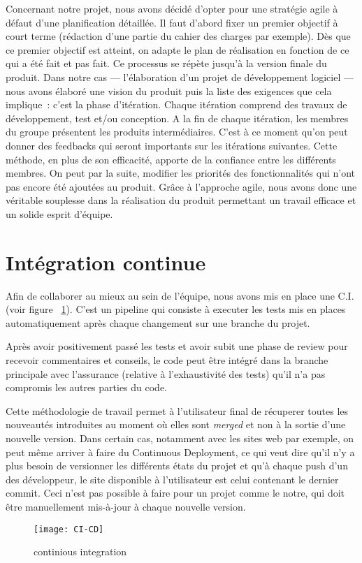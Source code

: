 Concernant notre projet, nous avons décidé d’opter pour une stratégie agile à
défaut d’une planification détaillée. Il faut d’abord fixer un premier objectif
à court terme (rédaction d’une partie du cahier des charges par exemple). Dès
que ce premier objectif est atteint, on adapte le plan de réalisation en
fonction de ce qui a été fait et pas fait. Ce processus se répète jusqu’à la
version finale du produit.
Dans notre cas --- l’élaboration d’un projet de développement logiciel --- nous
avons élaboré une vision du produit puis la liste des exigences que cela
implique : c’est la phase d’itération. Chaque itération comprend des travaux
de développement, test et/ou conception. A la fin de chaque itération, les membres
du groupe présentent les produits intermédiaires. C’est à ce moment qu’on peut
donner des feedbacks qui seront importants sur les itérations suivantes. Cette
méthode, en plus de son efficacité, apporte de la confiance entre les
différents membres.
On peut par la suite, modifier les priorités des fonctionnalités qui n’ont pas
encore été ajoutées au produit.
Grâce à l’approche agile, nous avons donc une  véritable souplesse dans la
réalisation du produit permettant un travail efficace et un solide esprit
d’équipe.

\section{Intégration continue}
Afin de collaborer au mieux au sein de l'équipe, nous avons mis en place
une C.I. (voir figure ~\ref{fig:CI-CD}). C'est un pipeline qui consiste à executer
les tests mis en places automatiquement après chaque changement sur une branche
du projet.
\vspace{0.5cm}

Après avoir positivement passé les tests et avoir subit une phase de review
pour recevoir commentaires et conseils, le code peut être intégré dans la
branche principale avec l'assurance (relative à l’exhaustivité des tests) qu'il
n'a pas compromis les autres parties du code.
\vspace{0.5cm}

Cette méthodologie de travail permet à l’utilisateur final de récuperer toutes
les nouveautés introduites au moment où elles sont \emph{merged} et non à la
sortie d’une nouvelle version. Dans certain cas, notamment avec les sites web
par exemple, on peut même arriver à faire du Continuous Deployment, ce qui veut
dire qu’il n’y a plus besoin de versionner les différents états du projet et
qu’à chaque push d’un des développeur, le site disponible à l’utilisateur est
celui contenant le dernier commit. Ceci n'est pas possible à faire pour un
projet comme le notre, qui doit être manuellement mis-à-jour à chaque nouvelle
version.

\begin{figure}[h]
  \texttt{[image: CI-CD]}
  \caption{continious integration}
  \label{fig:CI-CD}
\end{figure}
